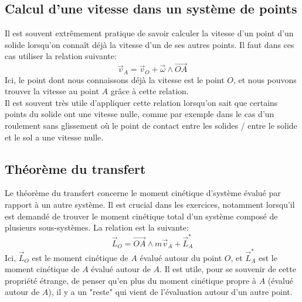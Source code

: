 \documentclass{article}
\numberwithin{equation}{section}
\begin{document}
\subsection{Calcul d'une vitesse dans un système de points}
Il est souvent extrêmement pratique de savoir calculer la vitesse d'un point d'un solide lorsqu'on connaît déjà la vitesse d'un de ses autres points. Il faut dans ces cas utiliser la relation suivante:
\begin{equation}
	\vec v_A = \vec v_O + \vec \omega \wedge \overrightarrow{OA}
\end{equation}
Ici, le point dont nous connaissons déjà la vitesse est le point \(O\), et nous pouvons trouver la vitesse au point \(A\) grâce à cette relation. \\
Il est souvent très utile d'appliquer cette relation lorsqu'on sait que certains points du solide ont une vitesse nulle, comme par exemple dans le cas d'un roulement sans glissement où le point de contact entre les solides / entre le solide et le sol a une vitesse nulle.

\subsection{Théorème du transfert}
Le théorème du transfert concerne le moment cinétique d'système évalué par rapport à un autre système. Il est crucial dans les exercices, notamment lorsqu'il est demandé de trouver le moment cinétique total d'un système composé de plusieurs sous-systèmes. La relation est la suivante:
\begin{equation}
	\vec L_O = \overrightarrow{OA} \wedge m \vec v_A + \vec L_A^*
\end{equation}
Ici, \(\vec L_O\) est le moment cinétique de \(A\) évalué autour du point \(O\), et \(\vec L_A^*\) est le moment cinétique de \(A\) évalué autour de \(A\). Il est utile, pour se souvenir de cette propriété étrange, de penser qu'en plus du moment cinétique propre à \(A\) (évalué autour de \(A\)), il y a un "reste" qui vient de l'évaluation autour d'un autre point.
\end{document}
